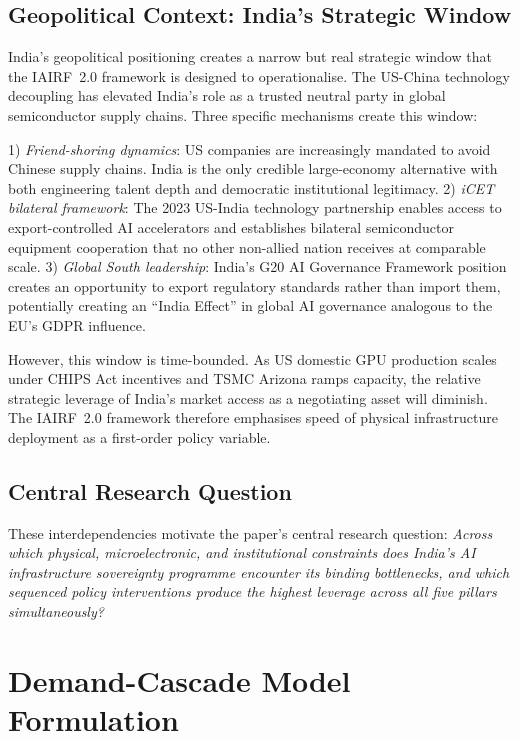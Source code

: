\documentclass[conference]{IEEEtran}
\begin{document}
\subsection{Geopolitical Context: India's Strategic Window}

India's geopolitical positioning creates a narrow but real strategic window that the IAIRF~2.0 framework is designed to operationalise. The US-China technology decoupling has elevated India's role as a trusted neutral party in global semiconductor supply chains. Three specific mechanisms create this window:

1) \textit{Friend-shoring dynamics}: US companies are increasingly mandated to avoid Chinese supply chains. India is the only credible large-economy alternative with both engineering talent depth and democratic institutional legitimacy. 2) \textit{iCET bilateral framework}: The 2023 US-India technology partnership \cite{whitehouse2023icet} enables access to export-controlled AI accelerators and establishes bilateral semiconductor equipment cooperation that no other non-allied nation receives at comparable scale. 3) \textit{Global South leadership}: India's G20 AI Governance Framework position creates an opportunity to export regulatory standards rather than import them, potentially creating an ``India Effect'' in global AI governance analogous to the EU's GDPR influence.

However, this window is time-bounded. As US domestic GPU production scales under CHIPS Act incentives and TSMC Arizona ramps capacity, the relative strategic leverage of India's market access as a negotiating asset will diminish. The IAIRF~2.0 framework therefore emphasises speed of physical infrastructure deployment as a first-order policy variable.

\subsection{Central Research Question}

These interdependencies motivate the paper's central research question: \textit{Across which physical, microelectronic, and institutional constraints does India's AI infrastructure sovereignty programme encounter its binding bottlenecks, and which sequenced policy interventions produce the highest leverage across all five pillars simultaneously?}

\section{Demand-Cascade Model Formulation}
\end{document}
